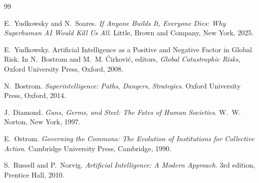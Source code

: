 \documentclass[11pt]{article}
\begin{document}
\begin{thebibliography}{99}

E.~Yudkowsky and N.~Soares.
\newblock \emph{If Anyone Builds It, Everyone Dies: Why Superhuman AI Would Kill Us All}.
\newblock Little, Brown and Company, New York, 2025.

E.~Yudkowsky.
\newblock Artificial Intelligence as a Positive and Negative Factor in Global Risk.
\newblock In N.~Bostrom and M.~M. Ćirković, editors,
\emph{Global Catastrophic Risks}, Oxford University Press, Oxford, 2008.

N.~Bostrom.
\newblock \emph{Superintelligence: Paths, Dangers, Strategies}.
\newblock Oxford University Press, Oxford, 2014.

J.~Diamond.
\newblock \emph{Guns, Germs, and Steel: The Fates of Human Societies}.
\newblock W.~W. Norton, New York, 1997.

E.~Ostrom.
\newblock \emph{Governing the Commons: The Evolution of Institutions for Collective Action}.
\newblock Cambridge University Press, Cambridge, 1990.

S.~Russell and P.~Norvig.
\newblock \emph{Artificial Intelligence: A Modern Approach}.
\newblock 3rd edition, Prentice Hall, 2010.

\end{thebibliography}
\end{document}
